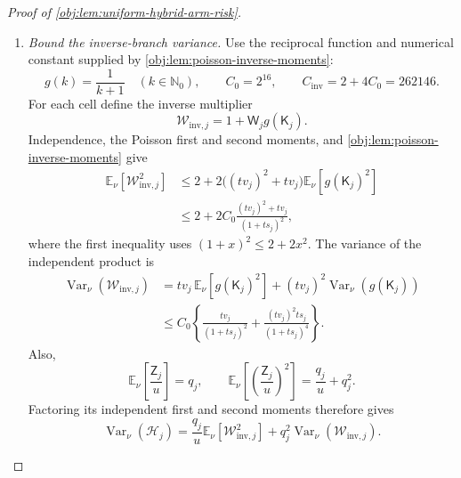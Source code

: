 \begin{proof}[Proof of \cref{obj:lem:uniform-hybrid-arm-risk}]
\begin{enumerate}
\item \textit{Bound the inverse-branch variance.}
Use the reciprocal function and numerical constant supplied by
\cref{obj:lem:poisson-inverse-moments}:
\[
g(k)=\frac1{k+1}\quad(k\in\mathbb N_0),
\qquad
C_0=2^{16},
\qquad
C_{\mathrm{inv}}=2+4C_0=262146.
\]
For each cell define the inverse multiplier
\[
\mathcal W_{\mathrm{inv},j}
=1+\mathsf W_jg(\mathsf K_j).
\]
Independence, the Poisson first and second moments, and
\cref{obj:lem:poisson-inverse-moments} give
\[
\begin{aligned}
\mathbb E_\nu[\mathcal W_{\mathrm{inv},j}^2]
&\le
2+2\bigl((tv_j)^2+tv_j\bigr)
\mathbb E_\nu[g(\mathsf K_j)^2]\\
&\le
2+2C_0\frac{(tv_j)^2+tv_j}{(1+ts_j)^2},
\end{aligned}
\]
where the first inequality uses \((1+x)^2\le2+2x^2\). The variance of the independent product is
\[
\begin{aligned}
\operatorname{Var}_\nu(\mathcal W_{\mathrm{inv},j})
&=tv_j\,\mathbb E_\nu[g(\mathsf K_j)^2]
+(tv_j)^2\operatorname{Var}_\nu(g(\mathsf K_j))\\
&\le C_0\left\{
\frac{tv_j}{(1+ts_j)^2}
+\frac{(tv_j)^2ts_j}{(1+ts_j)^4}
\right\}.
\end{aligned}
\]
Also,
\[
\mathbb E_\nu\!\left[\frac{\mathsf Z_j}{u}\right]=q_j,
\qquad
\mathbb E_\nu\!\left[\left(\frac{\mathsf Z_j}{u}\right)^2\right]
=\frac{q_j}{u}+q_j^2.
\]
Factoring its independent first and second moments therefore gives
\[
\operatorname{Var}_\nu(\mathcal H_j)
=
\frac{q_j}{u}\mathbb E_\nu[\mathcal W_{\mathrm{inv},j}^2]
+q_j^2\operatorname{Var}_\nu(\mathcal W_{\mathrm{inv},j}).
\]


\end{enumerate}
\end{proof}
